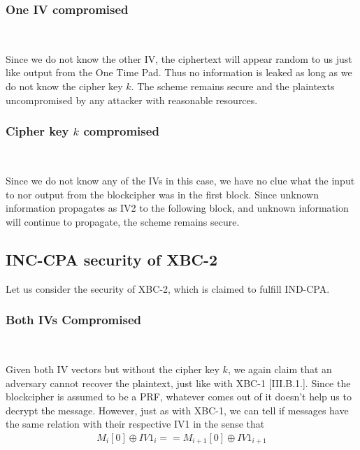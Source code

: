 \documentclass[conference]{IEEEtran}
\begin{document}
\subsubsection{One IV compromised} \

Since we do not know the other IV, the ciphertext will appear random to us just like output from the One Time Pad. Thus no information is leaked as long as we do not know the cipher key $k$. The scheme remains secure and the plaintexts uncompromised by any attacker with reasonable resources.

\subsubsection{Cipher key $k$ compromised} \

Since we do not know any of the IVs in this case, we have no clue what the input to nor output from the blockcipher was in the first block. Since unknown information propagates as IV2 to the following block, and unknown information will continue to propagate, the scheme remains secure.

\subsection{INC-CPA security of XBC-2}

Let us consider the security of XBC-2, which is claimed to fulfill IND-CPA.


\subsubsection{Both IVs Compromised} \

Given both IV vectors but without the cipher key $k$, we again claim that an adversary cannot recover the plaintext, just like with XBC-1 [III.B.1.]. Since the blockcipher is assumed to be a PRF, whatever comes out of it doesn't help us to decrypt the message. However, just as with XBC-1, we can tell if messages have the same relation with their respective IV1 in the sense that
\begin{gather*}
  M_i[0] \oplus IV1_i == M_{i+1}[0] \oplus IV1_{i+1}
\end{gather*}
\end{document}
